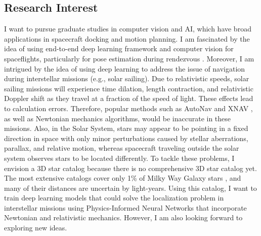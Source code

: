\documentclass[a4,25pt]{article}
\begin{document}
\begin{large}
\subsection{Research Interest}
\quad I want to pursue graduate studies in computer vision and AI, which have broad applications in spacecraft docking and motion planning. I am fascinated by the idea of using end-to-end deep learning framework and computer vision for spaceflights, particularly for pose estimation during rendezvous \cite{park2022cnnukf}. Moreover, I am intrigued by the idea of using deep learning to address the issue of navigation during interstellar missions (e.g., solar sailing). Due to relativistic speeds, solar sailing missions will experience time dilation, length contraction, and relativistic Doppler shift as they travel at a fraction of the speed of light. These effects lead to calculation errors. Therefore, popular methods such as AutoNav \cite{team2000autonomous} and XNAV \cite{graven2008xnav}, as well as Newtonian mechanics algorithms, would be inaccurate in these missions. Also, in the Solar System, stars may appear to be pointing in a fixed direction in space with only minor perturbations caused by stellar aberrations, parallax, and relative motion, whereas spacecraft traveling outside the solar system observes stars to be located differently. To tackle these problems, I envision a 3D star catalog because there is no comprehensive 3D star catalog yet. The most extensive catalogs cover only 1\% of Milky Way Galaxy stars \cite{mckee2022navigation}, and many of their distances are uncertain by light-years. Using this catalog, I want to train deep learning models that could solve the localization problem in interstellar missions using Physics-Informed Neural Networks that incorporate Newtonian and relativistic mechanics. However, I am also looking forward to exploring new ideas. \par

\end{large}
\end{document}
